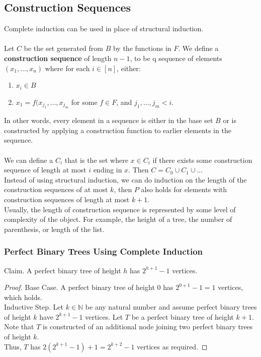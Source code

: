\documentclass{article}
\begin{document}
\subsection{Construction Sequences}
Complete induction can be used in place of structural induction.\\
\\
Let $C$ be the set generated from $B$ by the functions in $F$. We define a \textbf{construction sequence} of length $n - 1$, to be q sequence of elements $(x_1, ..., x_n)$ where for each $i \in [n]$, either:
\begin{enumerate}
    \item $x_i \in B$
    \item $x_1 = f(x_{j_1}, ..., x_{j_m}$ for some $f \in F$, and $j_1, ..., j_m < i$.
\end{enumerate}
In other words, every element in a sequence is either in the base set $B$ or is constructed by applying a construction function to earlier elements in the sequence.\\
\\
We can define a $C_i$ that is the set where $x \in C_i$ if there exists some construction sequence of length at most $i$ ending in $x$. Then $C = C_0 \cup C_1 \cup ...$\\
Instead of using structural induction, we can do induction on the length of the construction sequences of at most $k$, then $P$ also holds for elements with construction sequences of length at most $k + 1$.\\
Usually, the length of construction sequence is represented by some level of complexity of the object. For example, the height of a tree, the number of parenthesis, or length of the list.

\subsubsection{Perfect Binary Trees Using Complete Induction}
Claim. A perfect binary tree of height $h$ has $2^{h + 1} - 1$ vertices.
\begin{proof}
Base Case. A perfect binary tree of height $0$ has $2^{0 + 1} - 1 = 1$ vertices, which holds.\\
Inductive Step. Let $k \in \mathbb{N}$ be any natural number and assume perfect binary trees of height $k$ have $2^{k + 1} - 1$ vertices. Let $T$  be a perfect binary tree of height $k + 1$. Note that $T$ is constructed of an additional node joining two perfect binary trees of height $k$.\\
Thus, $T$ has $2(2^{k + 1} - 1) + 1 = 2^{k + 2} - 1$ vertices as required.
\end{proof}
\end{document}
